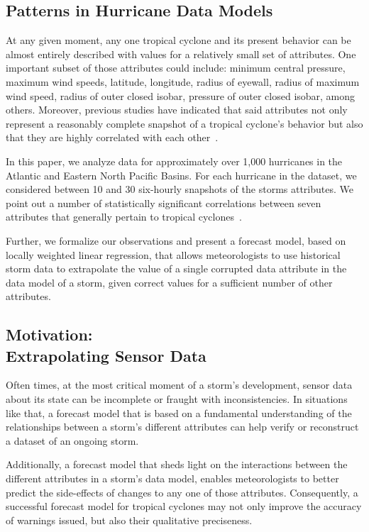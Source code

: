 \documentclass[letterpaper,twocolumn,10pt]{article}
\begin{document}
\subsection{Patterns in Hurricane Data Models}
At any given moment, any one tropical cyclone and its present behavior can be
almost entirely described with values for a relatively small set of attributes.
One important subset of those attributes could include: minimum central
pressure, maximum wind speeds, latitude, longitude, radius of eyewall, radius of
maximum wind speed, radius of outer closed isobar, pressure of outer closed
isobar, among others. Moreover, previous studies have indicated that said
attributes not only represent a reasonably complete snapshot of a tropical
cyclone's behavior but also that they are highly correlated with each
other~\cite{SHIPS}.

In this paper, we analyze data for approximately over 1,000 hurricanes in the
Atlantic and Eastern North Pacific Basins. For each hurricane in the dataset, we
considered between 10 and 30 six-hourly snapshots of the storms attributes. We
point out a number of statistically significant correlations between seven
attributes that generally pertain to tropical cyclones~\cite{SHIPS}.

Further, we formalize our observations and present a forecast
model, based on locally weighted linear regression, that allows meteorologists
to use historical storm data to extrapolate the value of a single corrupted data
attribute in the data model of a storm, given correct values for a sufficient
number of other attributes.

\subsection{Motivation:\\Extrapolating Sensor Data}
Often times, at the most critical moment of a storm's development, sensor data
about its state can be incomplete or fraught with inconsistencies. In situations
like that, a forecast model that is based on a fundamental understanding of the
relationships between a storm's different attributes can help verify or 
reconstruct a dataset of an ongoing storm.

Additionally, a forecast model that sheds light on the interactions between
the different attributes in a storm's data model, enables meteorologists to
better predict the side-effects of changes to any one of those attributes.
Consequently, a successful forecast model for tropical cyclones may not only
improve the accuracy of warnings issued, but also their qualitative preciseness.
\end{document}
